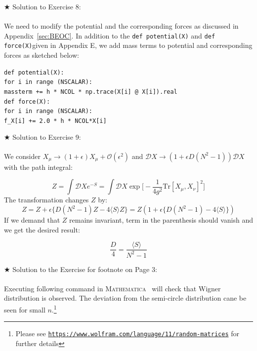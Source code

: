 \documentclass[letter,11pt]{article}
\newcommand{\MA}{\textsc{Mathematica}}
\newcommand\tab[1][1cm]{\hspace*{#1}}
\begin{document}
\noindent $\bigstar$ Solution to Exercise 8:
\\  \\ 
We need to modify the potential and the corresponding forces as discussed in Appendix~\ref{sec:BEOC}. In addition to the \verb"def potential(X)" 
and \verb"def force(X)"given in Appendix E, we add mass terms to potential and corresponding forces as sketched below: 

\begin{footnotesize} 

\begin{mdframed}[backgroundcolor=blue!3] 
 \verb"def potential(X):" \\
 \tab	\verb"for i in range (NSCALAR):" \\ 
    \tab     \tab	\verb"massterm += h * NCOL * np.trace(X[i] @ X[i]).real" \\
    
\vspace{5mm} 
\noindent
\verb"def force(X):" \\ 
\tab	\verb"for i in range (NSCALAR):"  \\ 
       \tab  \tab 	\verb"f_X[i] += 2.0 * h * NCOL*X[i] " 
\end{mdframed}
\end{footnotesize} 

\noindent $\bigstar$ Solution to Exercise 9: 
\\ \\ 
We consider $ X_{\mu} \to (1 + \epsilon) X_{\mu} + \mathcal{O}(\epsilon^2)$
and $\mathcal{D}X \to (1 + \epsilon D (N^2-1))\mathcal{D}X$ with the path integral:

\begin{equation}
	Z = \int \mathcal{D}X e^{-S} = \int \mathcal{D}X \exp\Big[-\frac{1}{4g^2} \mbox{Tr} [X_\mu,X_\nu]^2\Big]
\end{equation}
The transformation changes $Z$ by:
\begin{equation}
	Z = Z + \epsilon \Big\{ D(N^2 -1)Z - 4\langle S \rangle Z  \Big\} = Z ( 1 + \epsilon \Big\{ D(N^2 -1) - 4\langle S \rangle   \Big\})
\end{equation}
If we demand that $Z$ remains invariant, term in the parenthesis should vanish and we get the desired result:

\begin{equation}
	\frac{D}{4} = \frac{\langle S \rangle}{N^2 - 1 }
\end{equation}  
           
\noindent $\bigstar$ Solution to the Exercise for footnote on Page 3:
\\  \\
Executing following command in \MA~ will check that Wigner distribution is 
observed. The deviation from the semi-circle distribution cane be seen for small 
$n$.\footnote{Please see \texttt{\href{https://www.wolfram.com/language/11/random-matrices}{https://www.wolfram.com/language/11/random-matrices}} for further details}
\end{document}
